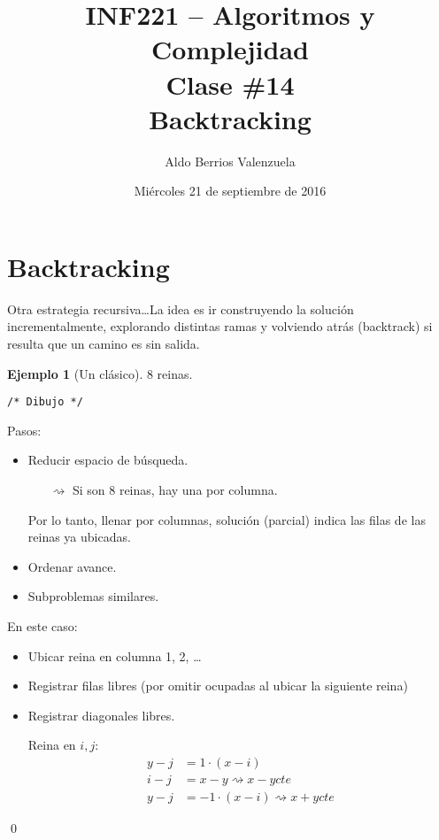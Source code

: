\documentclass[english, spanish, fleqn, 10pt]{article}
\title{INF221 -- Algoritmos y Complejidad\\[.4\baselineskip]Clase \#14\\Backtracking}
\author{Aldo Berrios Valenzuela}
\date{Miércoles 21 de septiembre de 2016}
\newcommand{\ccomment}[1]{\texttt{\textcolor{webred}{/* #1 */}}}
\numberwithin{equation}{section}
\newcommand{\nparentesis}[1]{\left( #1 \right)}
\theoremstyle{definition}
\newtheorem{beforeExample}{Ejemplo}[section]
\newenvironment{ejemplo}[1][]{\begin{beforeExample}[#1]\renewcommand{\qedsymbol}{$\blacksquare$}}{\qed\end{beforeExample}}
\begin{document}
\maketitle
\section{Backtracking}
Otra estrategia recursiva\ldots La idea es ir construyendo la solución incrementalmente, explorando distintas ramas y volviendo atrás (backtrack) si  resulta que un camino es sin salida.

\begin{ejemplo}[Un clásico]
	8 reinas.
	\begin{center}
		\ccomment{Dibujo}
	\end{center}
	Pasos:
	\begin{itemize}
		\item Reducir espacio de búsqueda.
		\begin{itemize}
			\item [$\rightsquigarrow$] Si son 8 reinas, hay una por columna.
		\end{itemize}
		Por lo tanto, llenar por columnas, solución (parcial) indica las filas de las reinas ya ubicadas.
		
		\item Ordenar avance.
		
		\item Subproblemas similares.
	\end{itemize}
	
	En este caso:
	\begin{itemize}
		\item Ubicar reina en columna 1, 2, \ldots
		
		\item Registrar filas libres (por omitir ocupadas al ubicar la siguiente reina)
		
		\item Registrar diagonales libres.
		
		Reina en $i, j$:
		\begin{align*}
		y-j&=1\cdot \nparentesis{x-i}\\
		i-j&=x-y\rightsquigarrow x-y\mathit{cte}\\
		y-j&=-1\cdot \nparentesis{x-i}\rightsquigarrow x+y\mathit{cte}
		\end{align*}
	\end{itemize}
	

\end{ejemplo}
\end{document}
